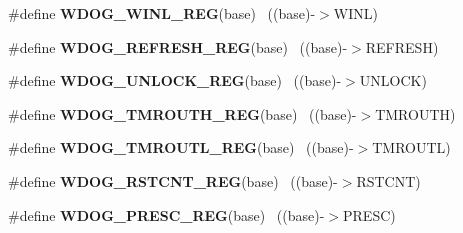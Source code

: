 \begin{DoxyCompactItemize}
\item 
\hypertarget{group___w_d_o_g___register___accessor___macros_ga7d3de8371302abe17948011dd6ae8522}{}\#define {\bfseries W\+D\+O\+G\+\_\+\+W\+I\+N\+L\+\_\+\+R\+E\+G}(base)                                        ~((base)-\/$>$W\+I\+N\+L)\label{group___w_d_o_g___register___accessor___macros_ga7d3de8371302abe17948011dd6ae8522}

\item 
\hypertarget{group___w_d_o_g___register___accessor___macros_ga706e227590678130bb2b7fc04e0263d1}{}\#define {\bfseries W\+D\+O\+G\+\_\+\+R\+E\+F\+R\+E\+S\+H\+\_\+\+R\+E\+G}(base)                                  ~((base)-\/$>$R\+E\+F\+R\+E\+S\+H)\label{group___w_d_o_g___register___accessor___macros_ga706e227590678130bb2b7fc04e0263d1}

\item 
\hypertarget{group___w_d_o_g___register___accessor___macros_ga0424f1f517c5ed49f00c67fc4454bba5}{}\#define {\bfseries W\+D\+O\+G\+\_\+\+U\+N\+L\+O\+C\+K\+\_\+\+R\+E\+G}(base)                                    ~((base)-\/$>$U\+N\+L\+O\+C\+K)\label{group___w_d_o_g___register___accessor___macros_ga0424f1f517c5ed49f00c67fc4454bba5}

\item 
\hypertarget{group___w_d_o_g___register___accessor___macros_ga6c5cca0fc2aeec6d1f8808f55c57acbb}{}\#define {\bfseries W\+D\+O\+G\+\_\+\+T\+M\+R\+O\+U\+T\+H\+\_\+\+R\+E\+G}(base)                                  ~((base)-\/$>$T\+M\+R\+O\+U\+T\+H)\label{group___w_d_o_g___register___accessor___macros_ga6c5cca0fc2aeec6d1f8808f55c57acbb}

\item 
\hypertarget{group___w_d_o_g___register___accessor___macros_gaed1d5071ac9fb7f531fdda660780a329}{}\#define {\bfseries W\+D\+O\+G\+\_\+\+T\+M\+R\+O\+U\+T\+L\+\_\+\+R\+E\+G}(base)                                  ~((base)-\/$>$T\+M\+R\+O\+U\+T\+L)\label{group___w_d_o_g___register___accessor___macros_gaed1d5071ac9fb7f531fdda660780a329}

\item 
\hypertarget{group___w_d_o_g___register___accessor___macros_ga321d566d296ee323809e242077a1c776}{}\#define {\bfseries W\+D\+O\+G\+\_\+\+R\+S\+T\+C\+N\+T\+\_\+\+R\+E\+G}(base)                                    ~((base)-\/$>$R\+S\+T\+C\+N\+T)\label{group___w_d_o_g___register___accessor___macros_ga321d566d296ee323809e242077a1c776}

\item 
\hypertarget{group___w_d_o_g___register___accessor___macros_gacbfa99926928928f05da2e4c752ea945}{}\#define {\bfseries W\+D\+O\+G\+\_\+\+P\+R\+E\+S\+C\+\_\+\+R\+E\+G}(base)                                      ~((base)-\/$>$P\+R\+E\+S\+C)\label{group___w_d_o_g___register___accessor___macros_gacbfa99926928928f05da2e4c752ea945}


\end{DoxyCompactItemize}
